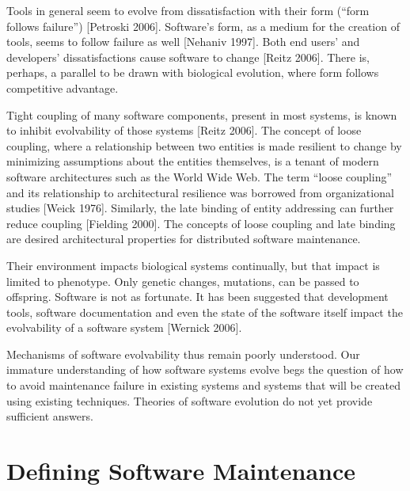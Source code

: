Tools in general seem to evolve from dissatisfaction with their form (``form follows failure'') [Petroski 2006].  Software's form, as a medium for the creation of tools, seems to follow failure as well [Nehaniv 1997].  Both end users' and developers' dissatisfactions cause software to change [Reitz 2006].  There is, perhaps, a parallel to be drawn with biological evolution, where form follows competitive advantage.

Tight coupling of many software components, present in most systems, is known to inhibit evolvability of those systems [Reitz 2006].  The concept of loose coupling, where a relationship between two entities is made resilient to change by minimizing assumptions about the entities themselves, is a tenant of modern software architectures such as the World Wide Web.  The term ``loose coupling'' and its relationship to architectural resilience was borrowed from organizational studies [Weick 1976]. Similarly, the late binding of entity addressing can further reduce coupling [Fielding 2000].  The concepts of loose coupling and late binding are desired architectural properties for distributed software maintenance.

Their environment impacts biological systems continually, but that impact is limited to phenotype.  Only genetic changes, mutations, can be passed to offspring.  Software is not as fortunate.  It has been suggested that development tools, software documentation and even the state of the software itself impact the evolvability of a software system [Wernick 2006].

Mechanisms of software evolvability thus remain poorly understood.  Our immature understanding of how software systems evolve begs the question of how to avoid maintenance failure in existing systems and systems that will be created using existing techniques.  Theories of software evolution do not yet provide sufficient answers.

\section{Defining Software Maintenance}

